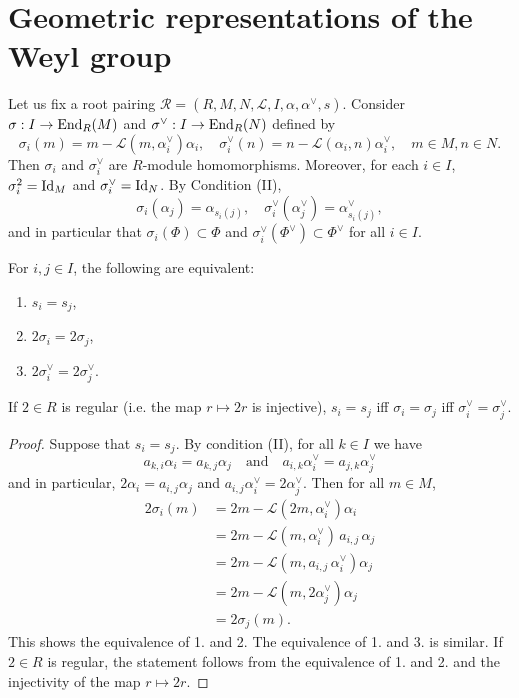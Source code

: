 \section{Geometric representations of the Weyl group}
Let us fix a root pairing $\mathcal{R} = (R,M,N,\mathcal{L},I,\alpha, \alpha^\vee,s)$. Consider $\sigma: I \to {\rm End}_R(M)$ and 
$\sigma^\vee : I \to {\rm End}_R(N)$ defined by
\[
    \sigma_i(m) = m - \mathcal{L}(m,\alpha^\vee_i)\alpha_i, \quad \sigma^\vee_i(n) = n - \mathcal{L}(\alpha_i,n)\alpha^\vee_i, \quad m \in M, n \in N.
\]
Then $\sigma_i$ and $\sigma^\vee_i$ are $R$-module homomorphisms. Moreover, 
for each $i \in I$, $\sigma_i^2 = {\rm Id}_M$ and $\sigma_i^\vee = {\rm Id}_N$. By Condition (II), 
\[
    \sigma_i(\alpha_j) = \alpha_{s_i(j)}, \quad \sigma^\vee_i(\alpha^\vee_j) = \alpha^\vee_{s_i(j)},
\]
and in particular that $\sigma_i(\Phi) \subset \Phi$ and 
$\sigma_i^\vee(\Phi^\vee) \subset \Phi^\vee$ for all $i \in I$.

\begin{lemma}
    For $i,j \in I$, the following are equivalent:
    \begin{enumerate}
        \item $s_i = s_j$,
        \item $2\sigma_i = 2\sigma_j$,
        \item $2\sigma_i^\vee = 2\sigma_j^\vee$.
    \end{enumerate}
    If $2 \in R$ is regular (i.e. the map $r \mapsto 2r$ is injective), $s_i = s_j$ iff
    $\sigma_i = \sigma_j$ iff $\sigma_i^\vee = \sigma_j^\vee$.  
\end{lemma}
\begin{proof}
Suppose that $s_i = s_j$. By condition (II), for all $k \in I$ we have
\[
    a_{k,i}\alpha_i = a_{k,j}\alpha_j \quad \text{and} \quad a_{i,k}\alpha_i^\vee = a_{j,k}\alpha_j^\vee
\]
and in particular, $2\alpha_i = a_{i,j}\alpha_j$ and $a_{i,j}\alpha_i^\vee = 2 \alpha_j^\vee$. Then for all $m \in M$,
\begin{align*}
    2\sigma_i(m) &= 2m - \mathcal{L}(2m,\alpha^\vee_i)\alpha_i \\
                &= 2m - \mathcal{L}(m,\alpha^\vee_i)\, a_{i,j} \,\alpha_j\\
                &= 2m - \mathcal{L}(m,a_{i,j}\, \alpha^\vee_i)\alpha_j\\
                &= 2m - \mathcal{L}(m,2\alpha^\vee_j)\alpha_j\\
                &= 2 \sigma_j(m).
\end{align*}
This shows the equivalence of 1. and 2. The equivalence of 1. and 3. is similar. If $2 \in R$ is regular, 
the statement follows from the equivalence of 1. and 2. and the injectivity of the map $r \mapsto 2r$.
\end{proof}

